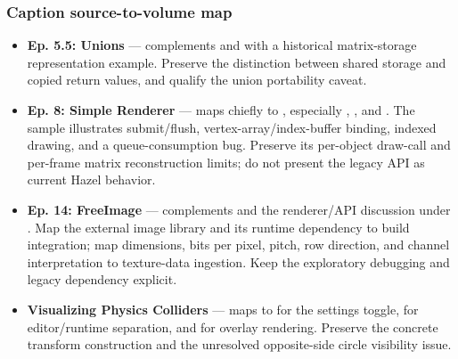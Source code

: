 \subsubsection{Caption source-to-volume map}\label{appendix-877738f6f4d2-caption-source-to-volume-map}

\hypertarget{appendix-877738f6f4d2-caption-source-to-volume-map}{}

\begin{itemize}
\tightlist
\item
  \textbf{Ep. 5.5: Unions} --- complements  and  with a historical matrix-storage representation example. Preserve the distinction between shared storage and copied return values, and qualify the union portability caveat.
\item
  \textbf{Ep. 8: Simple Renderer} --- maps chiefly to , especially , , and . The sample illustrates submit/flush, vertex-array/index-buffer binding, indexed drawing, and a queue-consumption bug. Preserve its per-object draw-call and per-frame matrix reconstruction limits; do not present the legacy API as current Hazel behavior.
\item
  \textbf{Ep. 14: FreeImage} --- complements  and the renderer/API discussion under . Map the external image library and its runtime dependency to build integration; map dimensions, bits per pixel, pitch, row direction, and channel interpretation to texture-data ingestion. Keep the exploratory debugging and legacy dependency explicit.
\item
  \textbf{Visualizing Physics Colliders} --- maps to  for the settings toggle,  for editor/runtime separation, and  for overlay rendering. Preserve the concrete transform construction and the unresolved opposite-side circle visibility issue.

\end{itemize}
